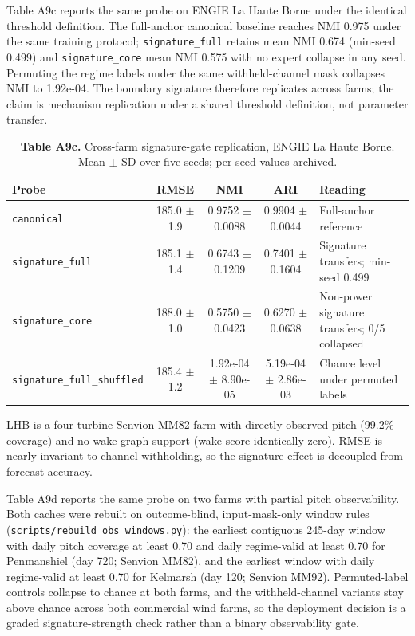 \documentclass[
  journal]{IEEEtran}
\begin{document}
Table A9c reports the same probe on ENGIE La Haute Borne under the
identical threshold definition. The full-anchor canonical baseline
reaches NMI 0.975 under the same training protocol;
\texttt{signature\_full} retains mean NMI 0.674 (min-seed 0.499) and
\texttt{signature\_core} mean NMI 0.575 with no expert collapse in any
seed. Permuting the regime labels under the same withheld-channel mask
collapses NMI to 1.92e-04. The boundary signature therefore replicates
across farms; the claim is mechanism replication under a shared
threshold definition, not parameter transfer.

\begin{table}[!t]
\centering
\fontsize{8.0pt}{9.2pt}\selectfont
\setlength{\tabcolsep}{3.5pt}
\renewcommand{\arraystretch}{1.03}
\caption*{\textbf{Table A9c.} Cross-farm signature-gate replication, ENGIE La Haute Borne. Mean $\pm$ SD over five seeds; per-seed values archived.}
%
\begin{tabularx}{\textwidth}{@{}l c c c >{\raggedright\arraybackslash}X@{}}
\toprule
Probe & RMSE & NMI & ARI & Reading \\
\midrule
\texttt{canonical} & 185.0 $\pm$ 1.9 & 0.9752 $\pm$ 0.0088 & 0.9904 $\pm$ 0.0044 & Full-anchor reference \\
\texttt{signature\_full} & 185.1 $\pm$ 1.4 & 0.6743 $\pm$ 0.1209 & 0.7401 $\pm$ 0.1604 & Signature transfers; min-seed 0.499 \\
\texttt{signature\_core} & 188.0 $\pm$ 1.0 & 0.5750 $\pm$ 0.0423 & 0.6270 $\pm$ 0.0638 & Non-power signature transfers; 0/5 collapsed \\
\texttt{signature\_full\_shuffled} & 185.4 $\pm$ 1.2 & 1.92e-04 $\pm$ 8.90e-05 & 5.19e-04 $\pm$ 2.86e-03 & Chance level under permuted labels \\
\bottomrule
\end{tabularx}
\vspace{1mm}
\raggedright\fontsize{8.0pt}{9.0pt}\selectfont LHB is a four-turbine Senvion MM82 farm with directly observed pitch (99.2\% coverage) and no wake graph support (wake score identically zero). RMSE is nearly invariant to channel withholding, so the signature effect is decoupled from forecast accuracy.
\end{table}

Table A9d reports the same probe on two farms with partial pitch
observability. Both caches were rebuilt on outcome-blind,
input-mask-only window rules
(\texttt{scripts/rebuild\_obs\_windows.py}): the earliest contiguous
245-day window with daily pitch coverage at least 0.70 and daily
regime-valid at least 0.70 for Penmanshiel (day 720; Senvion MM82), and
the earliest window with daily regime-valid at least 0.70 for Kelmarsh
(day 120; Senvion MM92). Permuted-label controls collapse to chance at
both farms, and the withheld-channel variants stay above chance across
both commercial wind farms, so the deployment decision is a graded
signature-strength check rather than a binary observability gate.
\end{document}
